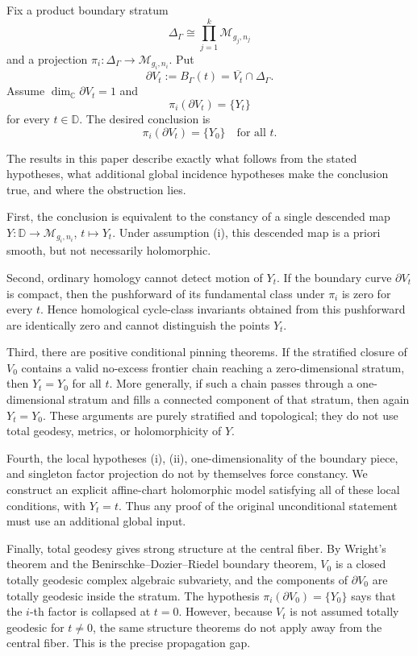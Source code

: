 \documentclass[12pt]{article}
\theoremstyle{plain}
\theoremstyle{definition}
\theoremstyle{remark}
\newcommand{\D}{\mathbb D}
\newcommand{\C}{\mathbb C}
\newcommand{\M}{\mathcal M}
\begin{document}
Fix a product boundary stratum
\[
\Delta_\Gamma \cong \prod_{j=1}^k \M_{g_j,n_j}
\]
and a projection \(\pi_i:\Delta_\Gamma\to \M_{g_i,n_i}\).  Put
\[
\partial V_t:=B_\Gamma(t)=\overline{V_t}\cap \Delta_\Gamma .
\]
Assume \(\dim_\C \partial V_t=1\) and
\[
\pi_i(\partial V_t)=\{Y_t\}
\]
for every \(t\in \D\).  The desired conclusion is
\[
\pi_i(\partial V_t)=\{Y_0\}\quad\text{for all }t.
\]

The results in this paper describe exactly what follows from the stated hypotheses, what additional global incidence hypotheses make the conclusion true, and where the obstruction lies.

First, the conclusion is equivalent to the constancy of a single descended map \(Y:\D\to \M_{g_i,n_i}\), \(t\mapsto Y_t\).  Under assumption (i), this descended map is a priori smooth, but not necessarily holomorphic.

Second, ordinary homology cannot detect motion of \(Y_t\).  If the boundary curve \(\partial V_t\) is compact, then the pushforward of its fundamental class under \(\pi_i\) is zero for every \(t\).  Hence homological cycle-class invariants obtained from this pushforward are identically zero and cannot distinguish the points \(Y_t\).

Third, there are positive conditional pinning theorems.  If the stratified closure of \(V_0\) contains a valid no-excess frontier chain reaching a zero-dimensional stratum, then \(Y_t=Y_0\) for all \(t\).  More generally, if such a chain passes through a one-dimensional stratum and fills a connected component of that stratum, then again \(Y_t=Y_0\).  These arguments are purely stratified and topological; they do not use total geodesy, metrics, or holomorphicity of \(Y\).

Fourth, the local hypotheses (i), (ii), one-dimensionality of the boundary piece, and singleton factor projection do not by themselves force constancy.  We construct an explicit affine-chart holomorphic model satisfying all of these local conditions, with \(Y_t=t\).  Thus any proof of the original unconditional statement must use an additional global input.

Finally, total geodesy gives strong structure at the central fiber.  By Wright's theorem and the Benirschke--Dozier--Riedel boundary theorem, \(V_0\) is a closed totally geodesic complex algebraic subvariety, and the components of \(\partial V_0\) are totally geodesic inside the stratum.  The hypothesis \(\pi_i(\partial V_0)=\{Y_0\}\) says that the \(i\)-th factor is collapsed at \(t=0\).  However, because \(V_t\) is not assumed totally geodesic for \(t\neq 0\), the same structure theorems do not apply away from the central fiber.  This is the precise propagation gap.
\end{document}
